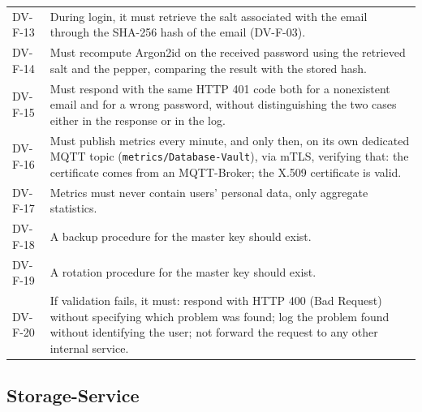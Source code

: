 \begin{longtable}{p{2.6cm} p{\dimexpr\linewidth-2.6cm-4\tabcolsep\relax}}
DV-F-13 & During login, it must retrieve the salt associated with the email through the SHA-256 hash of the email (DV-F-03). \\
DV-F-14 & Must recompute Argon2id on the received password using the retrieved salt and the pepper, comparing the result with the stored hash. \\
DV-F-15 & Must respond with the same HTTP 401 code both for a nonexistent email and for a wrong password, without distinguishing the two cases either in the response or in the log. \\
DV-F-16 & Must publish metrics every minute, and only then, on its own dedicated MQTT topic (\texttt{metrics/Database-Vault}), via mTLS, verifying that: the certificate comes from an MQTT-Broker; the X.509 certificate is valid. \\
DV-F-17 & Metrics must never contain users' personal data, only aggregate statistics. \\
DV-F-18 & A backup procedure for the master key should exist. \\
DV-F-19 & A rotation procedure for the master key should exist. \\
DV-F-20 & If validation fails, it must: respond with HTTP 400 (Bad Request) without specifying which problem was found; log the problem found without identifying the user; not forward the request to any other internal service. \\
\end{longtable}

\subsection{Storage-Service}

